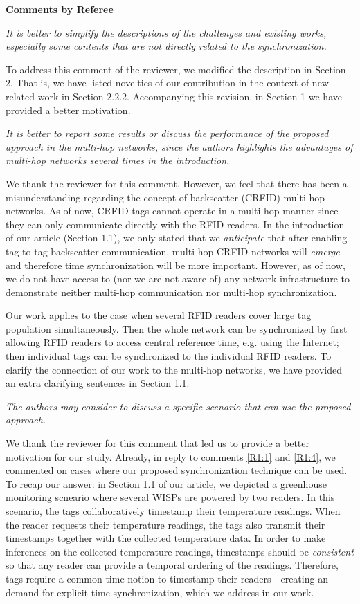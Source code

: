 \documentclass[10pt]{article}
\newcommand{\referee}[1]{
	{\item \color{OliveGreen} \emph{{#1}}}
	\label{R\therefereeCounter:\arabic{enumi}}
}
\newcommand{\response}[1]{{\color{blue} #1}}
\newcounter{refereeCounter}
\newenvironment{responses}{%
\refstepcounter{refereeCounter}%
\textbf{\large Comments by Referee \therefereeCounter}
\begin{enumerate}%
\renewcommand{\labelenumi}{\textbf{[R\therefereeCounter :\,\arabic{enumi}]}} %
}{\end{enumerate}}
\begin{document}
\begin{responses}

\referee{It is better to simplify the descriptions of the challenges and existing works, especially some contents that are not directly related to the synchronization.}
	
\response{To address this comment of the reviewer, we modified the description in Section 2. That is, we have listed novelties of our contribution in the context of new related work in Section 2.2.2. Accompanying this revision, in Section 1 we have provided a better motivation.}

\referee{It is better to report some results or discuss the performance of the proposed approach in the multi-hop networks, since the authors highlights the advantages of multi-hop networks several times in the introduction.}
	
\response{We thank the reviewer for this comment. However, we feel that there has been a misunderstanding regarding the concept of backscatter (CRFID) multi-hop networks. As of now, CRFID tags cannot operate in a multi-hop manner since they can only communicate directly with the RFID readers. In the introduction of our article (Section 1.1), we only stated that we \emph{anticipate} that after enabling tag-to-tag backscatter communication, multi-hop CRFID networks will \emph{emerge} and therefore time synchronization will be more important. However, as of now, we do not have access to (nor we are not aware of) any network infrastructure to demonstrate neither multi-hop communication nor multi-hop synchronization. 

Our work applies to the case when several RFID readers cover large tag population simultaneously. Then the whole network can be synchronized by first allowing RFID readers to access central reference time, e.g. using the Internet; then individual tags can be synchronized to the individual RFID readers. To clarify the connection of our work to the multi-hop networks, we have provided an extra clarifying sentences in Section 1.1.}
	
\referee{The authors may consider to discuss a specific scenario that can use the proposed approach.}
	
\response{We thank the reviewer for this comment that led us to provide a better motivation for our study. Already, in reply to comments \hyperref[R1:1]{[R1:1]} and \hyperref[R1:4]{[R1:4]}, we commented on cases where our proposed synchronization technique can be used. To recap our answer: in Section 1.1 of our article, we depicted a greenhouse monitoring scneario where several WISPs  are powered by two readers. In this scenario, the tags collaboratively timestamp their temperature readings. When the reader requests their temperature readings, the tags also transmit their timestamps together with the collected temperature data. In order to make inferences on the collected temperature readings, timestamps should be \emph{consistent} so that any reader can provide a temporal ordering of the readings. Therefore, tags require a common time notion to timestamp their readers---creating an demand for explicit time synchronization, which we address in our work.}

\end{responses}
\end{document}
